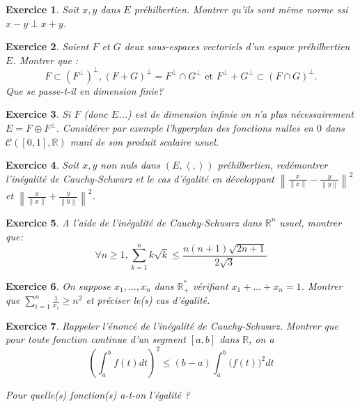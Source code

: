 \documentclass[12pt,a4paper]{article}
\newcommand{\norme}[1]{\left\lVert#1\right\rVert}
\newcommand{\ps}[2]{\left\langle#1,#2\right\rangle}
\newcommand{\R}{\mathbb{R}}
\theoremstyle{break}
\newtheorem{Exo}{Exercice}
\begin{document}
\begin{Exo}
Soit $x,y$ dans $E$ préhilbertien. Montrer qu'ils sont même norme ssi $x-y \perp x+y$.
\end{Exo}


\begin{Exo}
Soient $F$ et $G$ deux sous-espaces vectoriels d'un espace préhilbertien $E$. Montrer que :
$$F\subset (F^{\perp})^{\perp},(F+G)^\perp=F^\perp\cap G^\perp\text{ et }F^\perp+G^\perp\subset (F\cap G)^\perp.$$
Que se passe-t-il en dimension finie?
\end{Exo}

\begin{Exo}
	Si $F$ (donc $E$...) est de dimension infinie on n'a plus nécessairement $E=F\oplus F^{\perp}$. Considérer par exemple l'hyperplan des fonctions nulles en $0$ dans $\mathcal{C}([0,1],\R)$ muni de son produit scalaire usuel.
\end{Exo}

\begin{Exo}
		Soit $x,y$ non nuls dans $(E,\ps{}{})$ préhilbertien, redémontrer l'inégalité de Cauchy-Schwarz et le cas d'égalité en développant $\norme{\frac{x}{\norme{x}}-\frac{y}{\norme{y}}}^2$ et $\norme{\frac{x}{\norme{x}}+\frac{y}{\norme{y}}}^2$.
\end{Exo}

\begin{Exo}
A l'aide de l'inégalité de Cauchy-Schwarz dans $\R^n$ usuel, montrer que:
$$\forall n\geqslant 1,\sum_{k=1}^n k\sqrt{k}\leqslant \frac{n(n+1)\sqrt{2n+1}}{2\sqrt{3}}$$
\end{Exo}

\begin{Exo}
On suppose $x_1,...,x_n$ dans $\R_+^*$ vérifiant $x_1+...+x_n=1$. Montrer que $\sum_{i=1}^n\frac{1}{x_i}\geq n^2$ et préciser le(s) cas d'égalité.
\end{Exo}


\begin{Exo}
Rappeler l'énoncé de l'inégalité de Cauchy-Schwarz. Montrer que pour toute fonction continue d'un segment $[a,b]$ dans
$\R$, on a 
$$
  \left(\int_{a}^{b}{f(t)dt}\right)^{2}\leq
  (b-a)\int_{a}^{b}{\Big(f(t)\Big)^{2}dt}
$$

Pour quelle(s) fonction(s) a-t-on l'égalité ?
\end{Exo}

\end{document}
